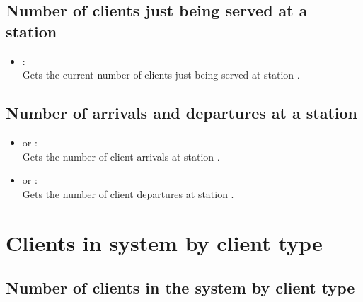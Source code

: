 \subsection{Number of clients just being served at a station}

\begin{itemize}

\item
{}:\\
Gets the current number of clients just being served at station .

\end{itemize}  



\subsection{Number of arrivals and departures at a station}

\begin{itemize}

\item
{} or :\\
Gets the number of client arrivals at station .

\item
{} or :\\
Gets the number of client departures at station .

\end{itemize}  





\section{Clients in system by client type}



\subsection{Number of clients in the system by client type}

